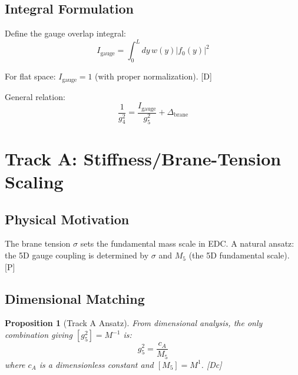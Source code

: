 \documentclass[11pt,a4paper]{article}
\newtheorem{proposition}[theorem]{Proposition}
\newcommand{\tagD}{\textcolor{blue!70!black}{[D]}}
\newcommand{\tagDc}{\textcolor{blue!50!black}{[Dc]}}
\newcommand{\tagP}{\textcolor{green!50!black}{[P]}}
\begin{document}
\subsection{Integral Formulation}

Define the gauge overlap integral:
\begin{equation}
\label{eq:I-gauge}
I_{\text{gauge}} = \int_0^L dy\, w(y) |f_0(y)|^2
\end{equation}

For flat space: $I_{\text{gauge}} = 1$ (with proper normalization). \tagD

General relation:
\begin{equation}
\label{eq:g4-general}
\frac{1}{g_4^2} = \frac{I_{\text{gauge}}}{g_5^2} + \Delta_{\text{brane}}
\end{equation}

\section{Track A: Stiffness/Brane-Tension Scaling}

\subsection{Physical Motivation}

The brane tension $\sigma$ sets the fundamental mass scale in EDC. A natural
ansatz: the 5D gauge coupling is determined by $\sigma$ and $M_5$ (the 5D
fundamental scale). \tagP

\subsection{Dimensional Matching}

\begin{proposition}[Track A Ansatz]
\label{prop:track-a}
From dimensional analysis, the only combination giving $[g_5^2] = M^{-1}$ is:
\begin{equation}
\label{eq:track-a-ansatz}
g_5^2 = \frac{c_A}{M_5}
\end{equation}
where $c_A$ is a dimensionless constant and $[M_5] = M^1$. \tagDc
\end{proposition}
\end{document}
